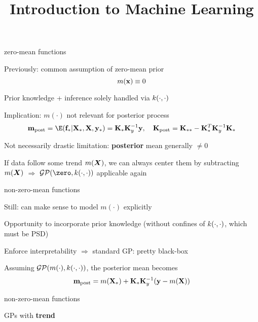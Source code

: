 \documentclass[11pt,compress,t,notes=noshow, xcolor=table]{beamer}
\title{Introduction to Machine Learning}
\begin{document}


\begin{framei}[sep=L]{zero-mean functions}
\item Previously: common assumption of zero-mean prior $$m(\mathbf{x}) \equiv 0$$
\item Prior knowledge + inference solely handled via $k(\cdot, \cdot)$
\item Implication: $m(\cdot)$ not relevant for posterior process
$$\mv_{\text{post}} = \E(\fs | \Xs, \Xmat, \ys) = \Ks \Ky^{-1} \yv, \quad \Kmat_{\text{post}} = \Kss - \Ks^T \Ky^{-1} \Ks$$
\item Not necessarily drastic limitation: \textbf{posterior} mean generally $\neq 0$
\item If data follow some trend $m(\bm{X})$, we can always center them by subtracting $m(\bm{X})$ $\Rightarrow$ $\GPzk$ applicable again
\end{framei}

\begin{framei}[sep=L]{non-zero-mean functions}
\item Still: can make sense to model $m(\cdot)$ explicitly
\item Opportunity to incorporate prior knowledge (without confines of $k(\cdot, \cdot)$, which must be PSD)
\item Enforce interpretability $\Rightarrow$ standard GP: pretty black-box
\item Assuming $\mathcal{GP}(m(\cdot), k(\cdot, \cdot))$, the posterior mean becomes
$$\mathbf{m}_{\text{post}} = m(\mathbf{X}_\ast) + \mathbf{K}_{\ast} \mathbf{K}_y^{-1} (\mathbf{y} - m(\mathbf{X}))$$

\end{framei}

\begin{framei}[sep=M]{non-zero-mean functions}
\item GPs with \textbf{trend}
\vfill
{}
\vfill
{}
\end{framei}
\end{document}
